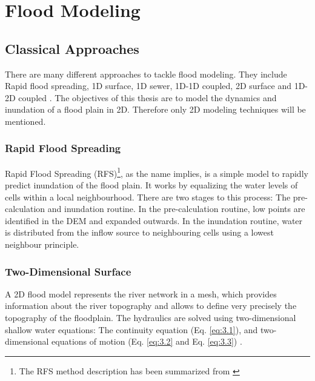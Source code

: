 
\chapter{Flood Modeling} %
\label{Chapter3} %
\section{Classical Approaches}

There are many different approaches to tackle flood modeling. They include Rapid flood spreading, 1D surface, 1D sewer, 1D-1D coupled, 2D surface and 1D-2D coupled \cite{bulti2020review}. The objectives of this thesis are to model the dynamics and inundation of a flood plain in 2D. Therefore only 2D modeling techniques will be mentioned.

\subsection*{Rapid Flood Spreading} 

Rapid Flood Spreading (RFS)\footnote{The RFS method description has been summarized from \citeauthor{liu2010new} \cite{liu2010new}}, as the name implies, is a simple model to rapidly predict inundation of the flood plain. It works by equalizing the water levels of cells within a local neighbourhood. There are two stages to this process: The pre-calculation and inundation routine. In the pre-calculation routine, low points are identified in the DEM and expanded outwards. In the inundation routine, water is distributed from the inflow source to neighbouring cells using a lowest neighbour principle.

	
\subsection*{Two-Dimensional Surface}
A 2D flood model represents the river network in a mesh, which provides information about the river topography and allows to define very precisely the topography of the floodplain. The hydraulics are solved using two-dimensional shallow  water equations: The continuity equation (Eq. \ref{eq:3.1}), and two-dimensional equations of motion (Eq. \ref{eq:3.2} and Eq. \ref{eq:3.3}) \cite{o1993two}.

